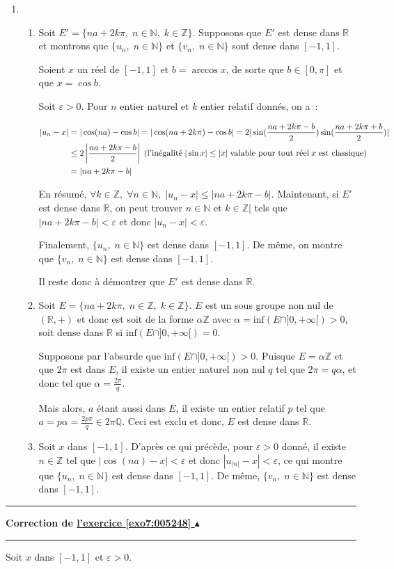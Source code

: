 \documentclass[11pt,a4paper]{article}
\newcommand{\Nn}{\mathbb{N}} \newcommand{\N}{\mathbb{N}}
\newcommand{\Zz}{\mathbb{Z}} \newcommand{\Z}{\mathbb{Z}}
\newcommand{\Qq}{\mathbb{Q}} \newcommand{\Q}{\mathbb{Q}}
\newcommand{\Rr}{\mathbb{R}} \newcommand{\R}{\mathbb{R}}
\newcommand{\Arccos}{\mathop{\mathrm{arccos}}\nolimits}
\newcounter{exo}
\newcommand{\correction}[1]{\hypertarget{cor7:#1}{}\label{cor7:#1}{\bf Correction de \hyperlink{exo7:#1}{l'exercice \ref{exo7:#1} $\blacktriangle$}}\vspace{1mm}\hrule\vspace{1mm}}
\newcommand{\fincorrection}{\vspace{1mm}\hrule\vspace*{7mm}}
\begin{document}
\begin{enumerate}
\item 
\begin{enumerate}
\item Soit $E'=\{na+2k\pi,\;n\in\Nn,\;k\in\Zz\}$. Supposons que $E'$ est dense dans $\Rr$ et montrons que $\{u_n,\;n\in\Nn\}$ et $\{v_n,\;n\in\Nn\}$ sont dense dans $[-1,1]$.

Soient $x$ un réel de $[-1,1]$ et $b=\Arccos x$, de sorte que $b\in[0,\pi]$ et que $x=\cos b$.

Soit $\varepsilon>0$. Pour $n$ entier naturel et $k$ entier relatif donnés, on a~:

\begin{align*}\ensuremath
|u_n-x|&=|\cos(na)-\cos b|=|\cos(na+2k\pi)-\cos b|=2|\sin(\frac{na+2k\pi-b}{2})\sin(\frac{na+2k\pi+b}{2})|\\
 &\leq2\left|\frac{na+2k\pi-b}{2}\right|\;(\mbox{l'inégalité}\;|\sin x|\leq|x|\;\mbox{valable pour tout réel}\;x\;\mbox{est classique})\\
 &=|na+2k\pi-b|
\end{align*}

En résumé, $\forall k\in\Zz,\;\forall n\in\Nn,\;|u_n-x|\leq|na+2k\pi-b|$. Maintenant, si $E'$ est dense dans $\Rr$, on peut trouver $n\in\Nn$ et $k\in\Zz|$ tels que $|na+2k\pi-b|<\varepsilon$ et donc $|u_n-x|<\varepsilon$.

Finalement, $\{u_n,\;n\in\Nn\}$ est dense dans $[-1,1]$. De même, on montre que $\{v_n,\;n\in\Nn\}$ est dense dans $[-1,1]$.

Il reste donc à démontrer que $E'$ est dense dans $\Rr$.

\item Soit $E=\{na+2k\pi,\;n\in\Zz,\;k\in\Zz\}$. $E$ est un sous groupe non nul de $(\Rr,+)$ et donc est soit de la forme $\alpha\Zz$ avec $\alpha=\mbox{inf}(E\cap]0,+\infty[)>0$, soit dense dans $\Rr$ si $\mbox{inf}(E\cap]0,+\infty[)=0$.

Supposons par l'absurde que $\mbox{inf}(E\cap]0,+\infty[)>0$. Puisque $E=\alpha\Zz$ et que $2\pi$ est dans $E$, il existe un entier naturel non nul $q$ tel que $2\pi=q\alpha$, et donc tel que $\alpha=\frac{2\pi}{q}$.

Mais alors, $a$ étant aussi dans $E$, il existe un entier relatif $p$ tel que $a=p\alpha=\frac{2p\pi}{q}\in2\pi\Qq$. Ceci est exclu et donc, $E$ est dense dans $\Rr$.

\item Soit $x$ dans $[-1,1]$. D'après ce qui précède, pour $\varepsilon>0$ donné, il existe $n\in\Zz$ tel que $|\cos(na)-x|<\varepsilon$ et donc $|u_{|n|}-x|<\varepsilon$, ce qui montre que $\{u_n,\;n\in\Nn\}$ est dense dans $[-1,1]$. De même, $\{v_n,\;n\in\Nn\}$ est dense dans $[-1,1]$.
\end{enumerate}
\end{enumerate}
\fincorrection
\correction{005248}
Soit $x$ dans $[-1,1]$ et $\varepsilon>0$.
\end{document}
